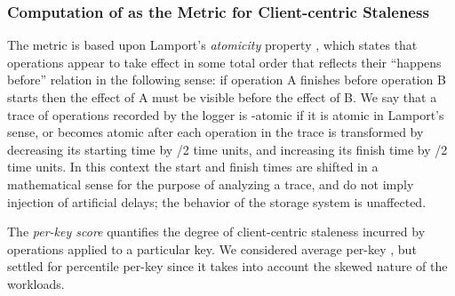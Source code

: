 \documentclass[conference]{IEEEtran}
\begin{document}
\subsubsection{Computation of  as the Metric for Client-centric Staleness}\label{sec:logstale}
   The metric  is based upon Lamport's \emph{atomicity} property \cite{lamport_atomic}, which states that operations appear to
	take effect in some total order that reflects their ``happens before'' relation in the following sense:
	if operation A finishes before operation B starts then the effect of A must be visible before the effect of B.
We say that a trace of operations recorded by the logger is {\boldmath}-atomic if it is atomic in Lamport's sense, or becomes atomic
after each operation in the trace is transformed by decreasing its starting time by {\boldmath}/2 time units, and increasing
its finish time by {\boldmath}/2 time units.
 In this context the start and finish times are shifted in a mathematical sense for the purpose of analyzing a trace, and do not imply injection of artificial delays;
the behavior of the storage system is unaffected.
\par The \emph{per-key  score} quantifies the degree of client-centric staleness incurred by operations applied to a particular key. We considered average per-key  , but settled for percentile per-key   since it takes into account the skewed nature of the workloads.  
\end{document}
